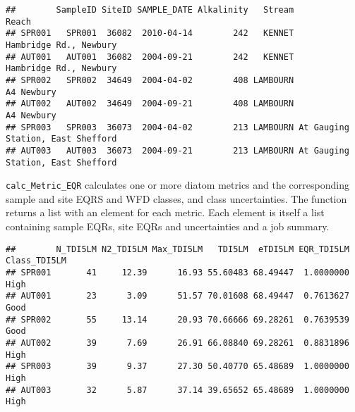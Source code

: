 \documentclass[]{article}
\newenvironment{Shaded}{\begin{snugshade}}{\end{snugshade}}
\newcommand{\DataTypeTok}[1]{\textcolor[rgb]{0.13,0.29,0.53}{#1}}
\newcommand{\DecValTok}[1]{\textcolor[rgb]{0.00,0.00,0.81}{#1}}
\newcommand{\KeywordTok}[1]{\textcolor[rgb]{0.13,0.29,0.53}{\textbf{#1}}}
\newcommand{\NormalTok}[1]{#1}
\newcommand{\OperatorTok}[1]{\textcolor[rgb]{0.81,0.36,0.00}{\textbf{#1}}}
\newcommand{\StringTok}[1]{\textcolor[rgb]{0.31,0.60,0.02}{#1}}
\begin{document}
\begin{verbatim}
##        SampleID SiteID SAMPLE_DATE Alkalinity   Stream                             Reach
## SPR001   SPR001  36082  2010-04-14        242   KENNET            Hambridge Rd., Newbury
## AUT001   AUT001  36082  2004-09-21        242   KENNET            Hambridge Rd., Newbury
## SPR002   SPR002  34649  2004-04-02        408 LAMBOURN                        A4 Newbury
## AUT002   AUT002  34649  2004-09-21        408 LAMBOURN                        A4 Newbury
## SPR003   SPR003  36073  2004-04-02        213 LAMBOURN At Gauging Station, East Shefford
## AUT003   AUT003  36073  2004-09-21        213 LAMBOURN At Gauging Station, East Shefford
\end{verbatim}

\texttt{calc\_Metric\_EQR} calculates one or more diatom metrics and the
corresponding sample and site EQRS and WFD classes, and class
uncertainties. The function returns a list with an element for each
metric. Each element is itself a list containing sample EQRs, site EQRs
and uncertainties and a job summary.

\begin{Shaded}
\end{Shaded}

\begin{verbatim}
##        N_TDI5LM N2_TDI5LM Max_TDI5LM   TDI5LM  eTDI5LM EQR_TDI5LM Class_TDI5LM
## SPR001       41     12.39      16.93 55.60483 68.49447  1.0000000         High
## AUT001       23      3.09      51.57 70.01608 68.49447  0.7613627         Good
## SPR002       55     13.14      20.93 70.66666 69.28261  0.7639539         Good
## AUT002       39      7.69      26.91 66.08840 69.28261  0.8831896         High
## SPR003       39      9.37      27.30 50.40770 65.48689  1.0000000         High
## AUT003       32      5.87      37.14 39.65652 65.48689  1.0000000         High
\end{verbatim}
\end{document}
